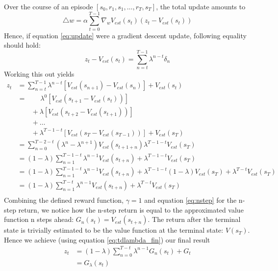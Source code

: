 Over the course of an episode $\left[s_0,r_1,s_1,\dotso,r_T,s_T\right]$, the total update amounts to
\begin{equation}
\bigtriangleup w =\alpha \sum_{t=0}^{T-1} \nabla_w V_{est}(s_t) (z_t-V_{est}(s_t))
\end{equation}
Hence, if equation \ref{eq:update} were a gradient descent update, following equality should hold:
\begin{equation}
z_t-V_{est}(s_t) = \sum_{n=t}^{T-1} \lambda^{n-t}\delta_n
\end{equation}
Working this out yields
\begin{align*}
z_t &=\sum_{n=t}^{T-1} \lambda^{n-t} \left[V_{est}(s_{n+1})-V_{est}(s_{n})\right]+V_{est}(s_t) \\
&= \quad \quad \lambda^0\left[V_{est}(s_{t+1}-V_{est}(s_t))\right] \\
& \quad \quad+\lambda\left[V_{est}(s_{t+2}-V_{est}(s_{t+1}))\right] \\
& \quad \quad+ \dotso\\
& \quad \quad +\lambda^{T-1-t}\left[V_{est}(s_{T}-V_{est}(s_{T-1}))\right] + V_{est}(s_T) \\
&= \sum_{n=0}^{T-2-t}(\lambda^n-\lambda^{n+1})V_{est}(s_{t+1+n}) \lambda^{T-1-t}V_{est}(s_T)\\
&= (1-\lambda)\sum_{n=1}^{T-1-t}\lambda^{n-1}V_{est}(s_{t+n}) + \lambda^{T-1-t}V_{est}(s_T)\\
&= (1-\lambda)\sum_{n=1}^{T-1-t}\lambda^{n-1}V_{est}(s_{t+n}) + \lambda^{T-1-t}(1-\lambda)V_{est}(s_T)+ \lambda^{T-t}V_{est}(s_T)\\
&= (1-\lambda)\sum_{n=1}^{T-t}\lambda^{n-1}V_{est}(s_{t+n}) + \lambda^{T-t}V_{est}(s_T)\\
\end{align*}
Combining the defined reward function, $\gamma=1$ and equation \ref{eq:nstep} for the n-step return, we notice how the n-step return is equal to the approximated value function n steps ahead: $G_n(s_t)=V_{est}(s_{t+n})$. The return after the terminal state is trivially estimated to be the value function at the terminal state: $V(s_T)$. Hence we achieve (using equation \ref{eq:tdlambda_fin}) our final result
\begin{align}
z_t&=(1-\lambda)\sum_{n=0}^{T-t}\lambda^{n-1}G_n(s_t) + G_t\\
&=G_\lambda(s_t)
\end{align}


